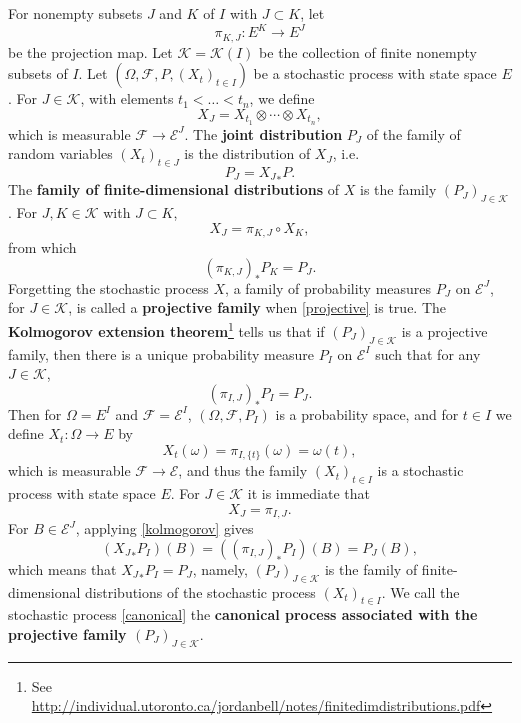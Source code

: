 \documentclass{article}
\theoremstyle{definition}
\begin{document}
For nonempty subsets $J$ and $K$ of $I$ with $J \subset K$, let
\[
\pi_{K,J}:E^K \to E^J
\]
be the projection map. 
Let $\mathscr{K}=\mathscr{K}(I)$ be the collection of finite nonempty subsets of $I$.
Let $(\Omega,\mathscr{F},P,(X_t)_{t \in I})$ be
a stochastic process 
with state space $E$.
For $J \in \mathscr{K}$, with elements $t_1<\ldots<t_n$, we define
\[
X_J = X_{t_1} \otimes \cdots \otimes X_{t_n},
\]
which is measurable $\mathscr{F} \to \mathscr{E}^J$. 
The \textbf{joint distribution} $P_J$ of the family of random variables
$(X_t)_{t \in J}$ is the distribution of $X_J$, i.e.
\[
P_J={X_J}_*P.
\]
The \textbf{family of finite-dimensional distributions} of $X$ is the family $(P_J)_{J \in \mathscr{K}}$. 
For $J,K \in \mathscr{K}$ with $J \subset K$,
\[
X_J = \pi_{K,J} \circ X_K,
\]
from which
\begin{equation}
(\pi_{K,J})_* P_K = P_J.
\label{projective}
\end{equation}
Forgetting the stochastic process $X$, a family of probability measures $P_J$ on $\mathscr{E}^J$, for $J \in \mathscr{K}$,
is called a \textbf{projective family} when \eqref{projective} is true. The \textbf{Kolmogorov extension theorem}\footnote{See \url{http://individual.utoronto.ca/jordanbell/notes/finitedimdistributions.pdf}}
tells us that if $(P_J)_{J \in \mathscr{K}}$ is a projective family, then there is a unique probability measure $P_I$
on $\mathscr{E}^I$ such that for any $J \in \mathscr{K}$,
\begin{equation}
(\pi_{I,J})_*P_I = P_J.
\label{kolmogorov}
\end{equation}
Then for $\Omega=E^I$ and $\mathscr{F}=\mathscr{E}^I$, $(\Omega,\mathscr{F},P_I)$ is a probability space, and for
$t \in I$ we define $X_t:\Omega \to E$ by
\begin{equation}
X_t(\omega) =\pi_{I,\{t\}}(\omega)= \omega(t),
\label{canonical}
\end{equation}
which is measurable $\mathscr{F} \to \mathscr{E}$, and thus the family $(X_t)_{t \in I}$ is a stochastic process with state space
$E$. For $J \in \mathscr{K}$ it is immediate that
\[
X_J = \pi_{I,J}.
\]
For $B \in \mathscr{E}^J$, applying \eqref{kolmogorov} gives
\[
({X_J}_*P_I)(B) = ((\pi_{I,J})_*P_I)(B) =P_J(B), 
\]
which means that ${X_J}_*P_I=P_J$, namely, $(P_J)_{J \in \mathscr{K}}$
is the family of finite-dimensional distributions of the stochastic process $(X_t)_{t \in I}$.
We call the stochastic process \eqref{canonical} the \textbf{canonical process associated with the projective family
$(P_J)_{J \in \mathscr{K}}$}.
\end{document}
